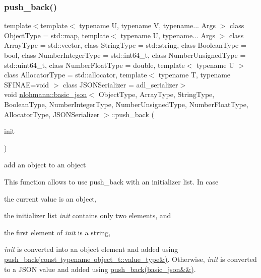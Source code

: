 \subsubsection{\texorpdfstring{push\_back()}{push\_back()}\hspace{0.1cm}{\footnotesize\ttfamily [4/4]}}
{\footnotesize\ttfamily template$<$template$<$ typename U, typename V, typename... Args $>$ class Object\+Type = std\+::map, template$<$ typename U, typename... Args $>$ class Array\+Type = std\+::vector, class String\+Type  = std\+::string, class Boolean\+Type  = bool, class Number\+Integer\+Type  = std\+::int64\+\_\+t, class Number\+Unsigned\+Type  = std\+::uint64\+\_\+t, class Number\+Float\+Type  = double, template$<$ typename U $>$ class Allocator\+Type = std\+::allocator, template$<$ typename T, typename S\+F\+I\+N\+A\+E=void $>$ class J\+S\+O\+N\+Serializer = adl\+\_\+serializer$>$ \\
void \mbox{\hyperlink{classnlohmann_1_1basic__json}{nlohmann\+::basic\+\_\+json}}$<$ Object\+Type, Array\+Type, String\+Type, Boolean\+Type, Number\+Integer\+Type, Number\+Unsigned\+Type, Number\+Float\+Type, Allocator\+Type, J\+S\+O\+N\+Serializer $>$\+::push\+\_\+back (\begin{DoxyParamCaption}\item[{std\+::initializer\+\_\+list$<$ \mbox{\hyperlink{classnlohmann_1_1basic__json}{basic\+\_\+json}}$<$ Object\+Type, Array\+Type, String\+Type, Boolean\+Type, Number\+Integer\+Type, Number\+Unsigned\+Type, Number\+Float\+Type, Allocator\+Type, J\+S\+O\+N\+Serializer $>$ $>$}]{init }\end{DoxyParamCaption})\hspace{0.3cm}{\ttfamily [inline]}}



add an object to an object 

This function allows to use {\ttfamily push\+\_\+back} with an initializer list. In case


\begin{DoxyEnumerate}
\item the current value is an object,
\item the initializer list {\itshape init} contains only two elements, and
\item the first element of {\itshape init} is a string,
\end{DoxyEnumerate}

{\itshape init} is converted into an object element and added using \mbox{\hyperlink{classnlohmann_1_1basic__json_ae11a3a51782c058fff2f6550cdfb9b3c}{push\+\_\+back(const typename object\+\_\+t\+::value\+\_\+type\&)}}. Otherwise, {\itshape init} is converted to a J\+S\+ON value and added using \mbox{\hyperlink{classnlohmann_1_1basic__json_ac8e523ddc8c2dd7e5d2daf0d49a9c0d7}{push\+\_\+back(basic\+\_\+json\&\&)}}.


